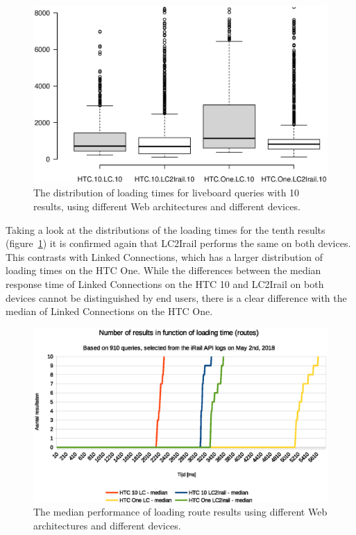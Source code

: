 \documentclass[twocolumn]{phdsymp} %
\begin{document}
\begin{figure}[ht]
	\begin{center}
		\includegraphics[trim=3cm 4cm 0 0, width=.50\textwidth]{images/boxplot_liveboards_10.eps}
		\caption{\label{fig:liveboardboxplot} The distribution of loading times for liveboard queries with 10 results, using different Web architectures and different devices. }
	\end{center}
\end{figure}

Taking a look at the distributions of the loading times for the tenth results (figure~\ref{fig:liveboardboxplot}) it is confirmed again that LC2Irail performs the same on both devices. This contrasts with Linked Connections, which has a larger distribution of loading times on the HTC One. While the differences between the median response time of Linked Connections on the HTC 10 and LC2Irail on both devices cannot be distinguished by end users, there is a clear difference with the median of Linked Connections on the HTC One.

\begin{figure}[ht]
	\begin{center}
		\includegraphics[width=.50\textwidth]{images/dief_routes_average.eps}
		\caption{\label{fig:route} The median performance of loading route results using different Web architectures and different devices.}
	\end{center}
\end{figure}
\end{document}
